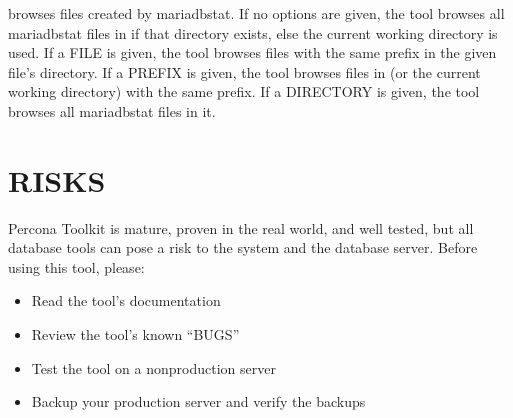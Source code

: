 \documentclass[letterpaper,10pt,english]{sphinxmanual}
\begin{document}
\sphinxAtStartPar
{} browses files created by mariadb\sphinxhyphen{}stat.  If no options are given,
the tool browses all mariadb\sphinxhyphen{}stat files in  if that directory
exists, else the current working directory is used.  If a FILE is given,
the tool browses files with the same prefix in the given file’s directory.
If a PREFIX is given, the tool browses files in 
(or the current working directory) with the same prefix.  If a DIRECTORY
is given, the tool browses all mariadb\sphinxhyphen{}stat files in it.


\section{RISKS}
\label{\detokenize{mariadb-stat-browser:risks}}
\sphinxAtStartPar
Percona Toolkit is mature, proven in the real world, and well tested,
but all database tools can pose a risk to the system and the database
server.  Before using this tool, please:
\begin{itemize}
\item {} 
\sphinxAtStartPar
Read the tool’s documentation

\item {} 
\sphinxAtStartPar
Review the tool’s known “BUGS”

\item {} 
\sphinxAtStartPar
Test the tool on a non\sphinxhyphen{}production server

\item {} 
\sphinxAtStartPar
Backup your production server and verify the backups

\end{itemize}
\end{document}

